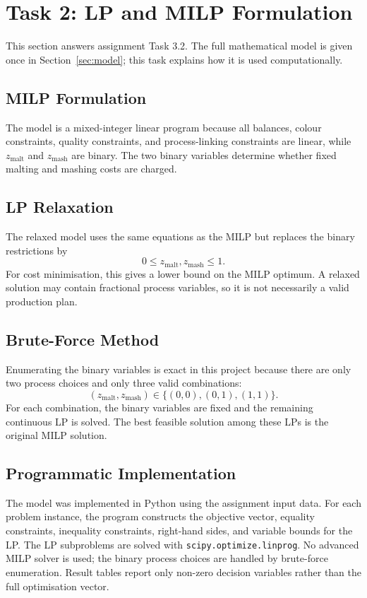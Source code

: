 \section{Task 2: LP and MILP Formulation}
\label{sec:task2}
This section answers assignment Task 3.2. The full mathematical model is given once in Section~\ref{sec:model}; this task explains how it is used computationally.

\subsection{MILP Formulation}
\label{sec:task2-milp}
The model is a mixed-integer linear program because all balances, colour constraints, quality constraints, and process-linking constraints are linear, while $z_{\mathrm{malt}}$ and $z_{\mathrm{mash}}$ are binary. The two binary variables determine whether fixed malting and mashing costs are charged.

\subsection{LP Relaxation}
\label{sec:task2-relaxation}
The relaxed model uses the same equations as the MILP but replaces the binary restrictions by
\begin{equation}
  0 \leq z_{\mathrm{malt}}, z_{\mathrm{mash}} \leq 1.
\end{equation}
For cost minimisation, this gives a lower bound on the MILP optimum. A relaxed solution may contain fractional process variables, so it is not necessarily a valid production plan.

\subsection{Brute-Force Method}
\label{sec:task2-bruteforce}
Enumerating the binary variables is exact in this project because there are only two process choices and only three valid combinations:
\[
(z_{\mathrm{malt}},z_{\mathrm{mash}})\in\{(0,0),(0,1),(1,1)\}.
\]
For each combination, the binary variables are fixed and the remaining continuous LP is solved. The best feasible solution among these LPs is the original MILP solution.

\subsection{Programmatic Implementation}
\label{sec:task2-implementation}
The model was implemented in Python using the assignment input data. For each problem instance, the program constructs the objective vector, equality constraints, inequality constraints, right-hand sides, and variable bounds for the LP. The LP subproblems are solved with \texttt{scipy.optimize.linprog}. No advanced MILP solver is used; the binary process choices are handled by brute-force enumeration. Result tables report only non-zero decision variables rather than the full optimisation vector.

